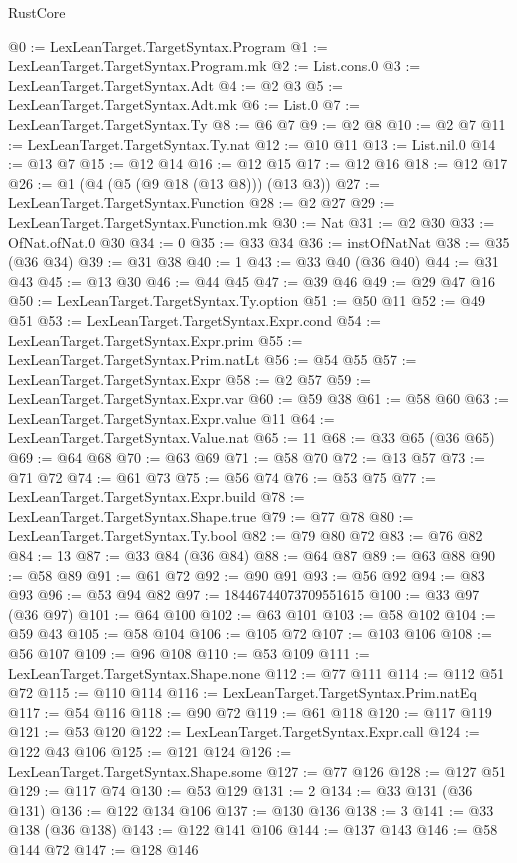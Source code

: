 \begin{lexlean}{RustCore}
\begin{coremodule}
@0 := LexLeanTarget.TargetSyntax.Program
@1 := LexLeanTarget.TargetSyntax.Program.mk
@2 := List.cons.{0}
@3 := LexLeanTarget.TargetSyntax.Adt
@4 := @2 @3
@5 := LexLeanTarget.TargetSyntax.Adt.mk
@6 := List.{0}
@7 := LexLeanTarget.TargetSyntax.Ty
@8 := @6 @7
@9 := @2 @8
@10 := @2 @7
@11 := LexLeanTarget.TargetSyntax.Ty.nat
@12 := @10 @11
@13 := List.nil.{0}
@14 := @13 @7
@15 := @12 @14
@16 := @12 @15
@17 := @12 @16
@18 := @12 @17
@26 := @1 (@4 (@5 (@9 @18 (@13 @8))) (@13 @3))
@27 := LexLeanTarget.TargetSyntax.Function
@28 := @2 @27
@29 := LexLeanTarget.TargetSyntax.Function.mk
@30 := Nat
@31 := @2 @30
@33 := OfNat.ofNat.{0} @30
@34 := 0
@35 := @33 @34
@36 := instOfNatNat
@38 := @35 (@36 @34)
@39 := @31 @38
@40 := 1
@43 := @33 @40 (@36 @40)
@44 := @31 @43
@45 := @13 @30
@46 := @44 @45
@47 := @39 @46
@49 := @29 @47 @16
@50 := LexLeanTarget.TargetSyntax.Ty.option
@51 := @50 @11
@52 := @49 @51
@53 := LexLeanTarget.TargetSyntax.Expr.cond
@54 := LexLeanTarget.TargetSyntax.Expr.prim
@55 := LexLeanTarget.TargetSyntax.Prim.natLt
@56 := @54 @55
@57 := LexLeanTarget.TargetSyntax.Expr
@58 := @2 @57
@59 := LexLeanTarget.TargetSyntax.Expr.var
@60 := @59 @38
@61 := @58 @60
@63 := LexLeanTarget.TargetSyntax.Expr.value @11
@64 := LexLeanTarget.TargetSyntax.Value.nat
@65 := 11
@68 := @33 @65 (@36 @65)
@69 := @64 @68
@70 := @63 @69
@71 := @58 @70
@72 := @13 @57
@73 := @71 @72
@74 := @61 @73
@75 := @56 @74
@76 := @53 @75
@77 := LexLeanTarget.TargetSyntax.Expr.build
@78 := LexLeanTarget.TargetSyntax.Shape.true
@79 := @77 @78
@80 := LexLeanTarget.TargetSyntax.Ty.bool
@82 := @79 @80 @72
@83 := @76 @82
@84 := 13
@87 := @33 @84 (@36 @84)
@88 := @64 @87
@89 := @63 @88
@90 := @58 @89
@91 := @61 @72
@92 := @90 @91
@93 := @56 @92
@94 := @83 @93
@96 := @53 @94 @82
@97 := 18446744073709551615
@100 := @33 @97 (@36 @97)
@101 := @64 @100
@102 := @63 @101
@103 := @58 @102
@104 := @59 @43
@105 := @58 @104
@106 := @105 @72
@107 := @103 @106
@108 := @56 @107
@109 := @96 @108
@110 := @53 @109
@111 := LexLeanTarget.TargetSyntax.Shape.none
@112 := @77 @111
@114 := @112 @51 @72
@115 := @110 @114
@116 := LexLeanTarget.TargetSyntax.Prim.natEq
@117 := @54 @116
@118 := @90 @72
@119 := @61 @118
@120 := @117 @119
@121 := @53 @120
@122 := LexLeanTarget.TargetSyntax.Expr.call
@124 := @122 @43 @106
@125 := @121 @124
@126 := LexLeanTarget.TargetSyntax.Shape.some
@127 := @77 @126
@128 := @127 @51
@129 := @117 @74
@130 := @53 @129
@131 := 2
@134 := @33 @131 (@36 @131)
@136 := @122 @134 @106
@137 := @130 @136
@138 := 3
@141 := @33 @138 (@36 @138)
@143 := @122 @141 @106
@144 := @137 @143
@146 := @58 @144 @72
@147 := @128 @146

\end{coremodule}
\end{lexlean}
